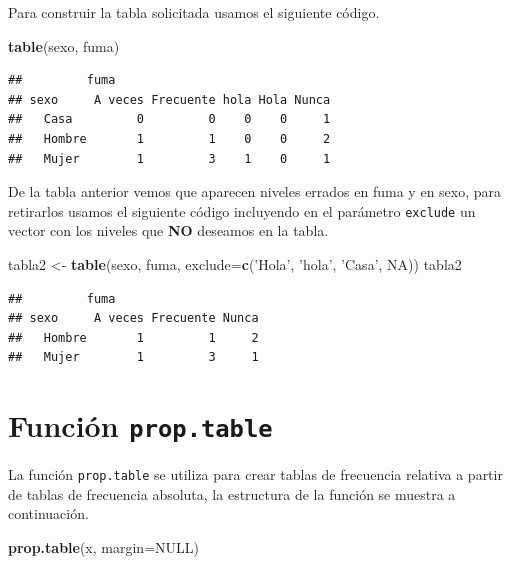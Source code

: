 \documentclass[10pt,]{krantz}
\makeatletter
\newenvironment{Shaded}{\begin{snugshade}}{\end{snugshade}}
\newcommand{\KeywordTok}[1]{\textcolor[rgb]{0.13,0.29,0.53}{\textbf{{#1}}}}
\newcommand{\DataTypeTok}[1]{\textcolor[rgb]{0.13,0.29,0.53}{{#1}}}
\newcommand{\StringTok}[1]{\textcolor[rgb]{0.31,0.60,0.02}{{#1}}}
\newcommand{\OtherTok}[1]{\textcolor[rgb]{0.56,0.35,0.01}{{#1}}}
\newcommand{\NormalTok}[1]{{#1}}
\newenvironment{kframe}{%
\medskip{}
\setlength{\fboxsep}{.8em}
 \def\at@end@of@kframe{}%
 \ifinner\ifhmode%
  \def\at@end@of@kframe{\end{minipage}}%
  \begin{minipage}{\columnwidth}%
 \fi\fi%
 \def\FrameCommand##1{\hskip\@totalleftmargin \hskip-\fboxsep
 \colorbox{shadecolor}{##1}\hskip-\fboxsep
     \hskip-\linewidth \hskip-\@totalleftmargin \hskip\columnwidth}%
 \MakeFramed {\advance\hsize-\width
   \@totalleftmargin\z@ \linewidth\hsize
   \@setminipage}}%
 {\par\unskip\endMakeFramed%
 \at@end@of@kframe}
\renewenvironment{Shaded}{\begin{kframe}}{\end{kframe}}
\makeatother
\begin{document}
Para construir la tabla solicitada usamos el siguiente código.

\begin{Shaded}
\begin{Highlighting}[]
\KeywordTok{table}\NormalTok{(sexo, fuma)}
\end{Highlighting}
\end{Shaded}

\begin{verbatim}
##         fuma
## sexo     A veces Frecuente hola Hola Nunca
##   Casa         0         0    0    0     1
##   Hombre       1         1    0    0     2
##   Mujer        1         3    1    0     1
\end{verbatim}

De la tabla anterior vemos que aparecen niveles errados en fuma y en
sexo, para retirarlos usamos el siguiente código incluyendo en el
parámetro \texttt{exclude} un vector con los niveles que \textbf{NO}
deseamos en la tabla.

\begin{Shaded}
\begin{Highlighting}[]
\NormalTok{tabla2 <-}\StringTok{ }\KeywordTok{table}\NormalTok{(sexo, fuma, }\DataTypeTok{exclude=}\KeywordTok{c}\NormalTok{(}\StringTok{'Hola'}\NormalTok{, }\StringTok{'hola'}\NormalTok{, }\StringTok{'Casa'}\NormalTok{, }\OtherTok{NA}\NormalTok{))}
\NormalTok{tabla2}
\end{Highlighting}
\end{Shaded}

\begin{verbatim}
##         fuma
## sexo     A veces Frecuente Nunca
##   Hombre       1         1     2
##   Mujer        1         3     1
\end{verbatim}

\section{\texorpdfstring{Función \texttt{prop.table}
}{Función prop.table }}\label{funcion-prop.table}

La función \texttt{prop.table} se utiliza para crear tablas de
frecuencia relativa a partir de tablas de frecuencia absoluta, la
estructura de la función se muestra a continuación.

\begin{Shaded}
\begin{Highlighting}[]
\KeywordTok{prop.table}\NormalTok{(x, }\DataTypeTok{margin=}\OtherTok{NULL}\NormalTok{)}
\end{Highlighting}
\end{Shaded}
\end{document}
